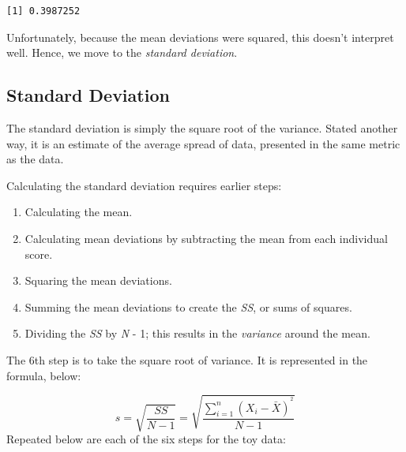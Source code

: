 \documentclass[
  11pt,
]{book}
\newenvironment{Shaded}{\begin{snugshade}}{\end{snugshade}}
\newcommand{\AttributeTok}[1]{\textcolor[rgb]{0.27,0.27,0.27}{#1}}
\newcommand{\CommentTok}[1]{\textcolor[rgb]{0.37,0.37,0.37}{\textit{#1}}}
\newcommand{\ConstantTok}[1]{\textcolor[rgb]{0.37,0.37,0.37}{#1}}
\newcommand{\DecValTok}[1]{\textcolor[rgb]{0.06,0.06,0.06}{#1}}
\newcommand{\FunctionTok}[1]{\textcolor[rgb]{0.27,0.27,0.27}{\textbf{#1}}}
\newcommand{\NormalTok}[1]{#1}
\newcommand{\OtherTok}[1]{\textcolor[rgb]{0.37,0.37,0.37}{#1}}
\newcommand{\SpecialCharTok}[1]{\textcolor[rgb]{0.43,0.43,0.43}{\textbf{#1}}}
\providecommand{\tightlist}{%
  \setlength{\itemsep}{0pt}\setlength{\parskip}{0pt}}
\begin{document}
\begin{verbatim}
[1] 0.3987252
\end{verbatim}

Unfortunately, because the mean deviations were squared, this doesn't interpret well. Hence, we move to the \emph{standard deviation}.

\hypertarget{standard-deviation}{%
\subsection{Standard Deviation}\label{standard-deviation}}

The standard deviation is simply the square root of the variance. Stated another way, it is an estimate of the average spread of data, presented in the same metric as the data.

Calculating the standard deviation requires earlier steps:

\begin{enumerate}
\def\labelenumi{\arabic{enumi}.}
\tightlist
\item
  Calculating the mean.
\item
  Calculating mean deviations by subtracting the mean from each individual score.
\item
  Squaring the mean deviations.
\item
  Summing the mean deviations to create the \emph{SS}, or sums of squares.
\item
  Dividing the \emph{SS} by \emph{N} - 1; this results in the \emph{variance} around the mean.
\end{enumerate}

The 6th step is to take the square root of variance. It is represented in the formula, below:

\[s=\sqrt{\frac{SS}{N-1}}=\sqrt{\frac{\sum_{i=1}^{n}(X_{i} - \bar{X})^{^{2}}}{N-1}}\] Repeated below are each of the six steps for the toy data:

\begin{Shaded}
\end{Shaded}
\end{document}
